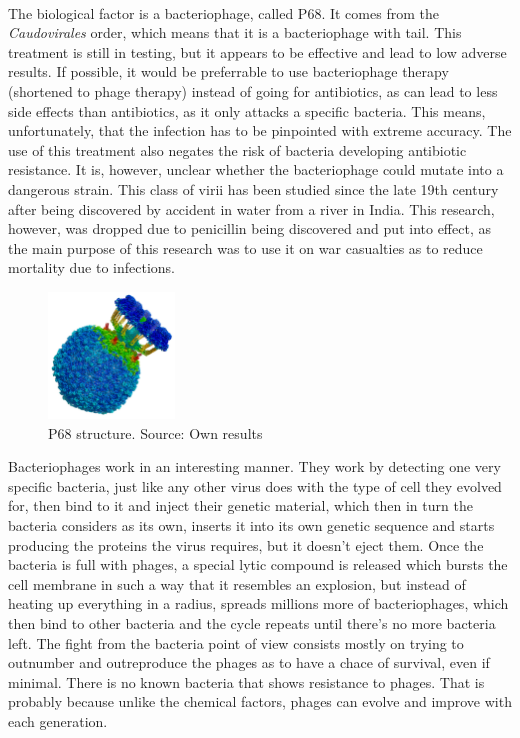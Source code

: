 \paragraph{}The biological factor is a bacteriophage, called P68. It comes from the \emph{Caudovirales} order, which means that it is a bacteriophage with tail.  This treatment is still in testing, but it appears to be effective and lead to low adverse results. If possible, it would be preferrable to use bacteriophage therapy (shortened to phage therapy) instead of going for antibiotics, as can lead to less side effects than antibiotics, as it only attacks a specific bacteria. This means, unfortunately, that the infection has to be pinpointed with extreme accuracy. The use of this treatment also negates the risk of bacteria developing antibiotic resistance. It is, however, unclear whether the bacteriophage could mutate into a dangerous strain. This class of virii has been studied since the late 19th century after being discovered by accident in water from a river in India. This research, however, was dropped due to penicillin being discovered and put into effect, as the main purpose of this research was to use it on war casualties as to reduce mortality due to infections.
\newpage{}\begin{figure}\begin{center}\includegraphics[width=0.30\textwidth]{assets/staph_side.png}\end{center}\caption{P68 structure. Source: Own results}\end{figure}Bacteriophages work in an interesting manner. They work by detecting one very specific bacteria, just like any other virus does with the type of cell they evolved for, then bind to it and inject their genetic material, which then in turn the bacteria considers as its own, inserts it into its own genetic sequence and starts producing the proteins the virus requires, but it doesn't eject them. Once the bacteria is full with phages, a special lytic compound is released which bursts the cell membrane in such a way that it resembles an explosion, but instead of heating up everything in a radius, spreads millions more of bacteriophages, which then bind to other bacteria and the cycle repeats until there's no more bacteria left. The fight from the bacteria point of view consists mostly on trying to outnumber and outreproduce the phages as to have a chace of survival, even if minimal. There is no known bacteria that shows resistance to phages. That is probably because unlike the chemical factors, phages can evolve and improve with each generation.
